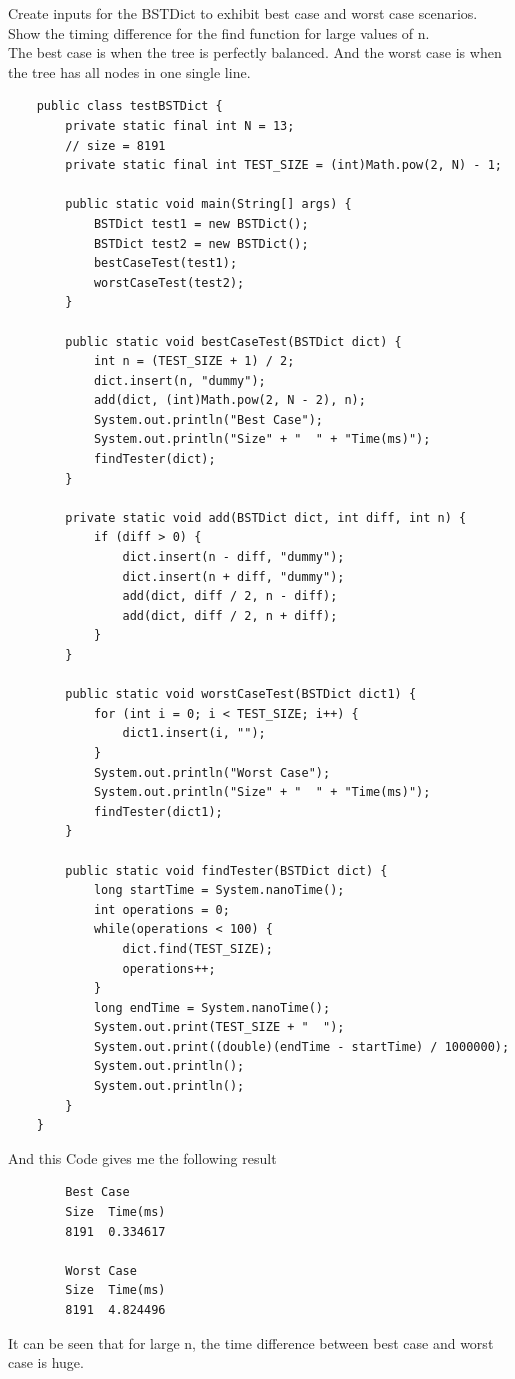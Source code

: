\documentclass[]{exam}
\begin{document}
\begin{questions}
	\question Create inputs for the BSTDict to exhibit best case and worst case scenarios. Show the timing difference for the find function for large values of n.
	\\ The best case is when the tree is perfectly balanced. And the worst case is when the tree has all nodes in one single line.
	\begin{Verbatim}
	public class testBSTDict {
		private static final int N = 13;
		// size = 8191
		private static final int TEST_SIZE = (int)Math.pow(2, N) - 1;

		public static void main(String[] args) {
			BSTDict test1 = new BSTDict();
			BSTDict test2 = new BSTDict();
			bestCaseTest(test1);
			worstCaseTest(test2);
		}
		
		public static void bestCaseTest(BSTDict dict) {
			int n = (TEST_SIZE + 1) / 2;
			dict.insert(n, "dummy");
			add(dict, (int)Math.pow(2, N - 2), n);
			System.out.println("Best Case");
			System.out.println("Size" + "  " + "Time(ms)");
			findTester(dict);
		}
		
		private static void add(BSTDict dict, int diff, int n) {
			if (diff > 0) {
				dict.insert(n - diff, "dummy");
				dict.insert(n + diff, "dummy");
				add(dict, diff / 2, n - diff);
				add(dict, diff / 2, n + diff);
			}
		}
		
		public static void worstCaseTest(BSTDict dict1) {
			for (int i = 0; i < TEST_SIZE; i++) {
				dict1.insert(i, "");
			}
			System.out.println("Worst Case");
			System.out.println("Size" + "  " + "Time(ms)");
			findTester(dict1);
		}
		
		public static void findTester(BSTDict dict) {
			long startTime = System.nanoTime();
			int operations = 0;
			while(operations < 100) {
				dict.find(TEST_SIZE);
				operations++;
			}
			long endTime = System.nanoTime();
			System.out.print(TEST_SIZE + "  ");
			System.out.print((double)(endTime - startTime) / 1000000);
			System.out.println();
			System.out.println();
		}
	}
	\end{Verbatim}
	And this Code gives me the following result\\
	\begin{Verbatim}
		Best Case
		Size  Time(ms)
		8191  0.334617

		Worst Case
		Size  Time(ms)
		8191  4.824496

	\end{Verbatim}
	It can be seen that for large n, the time difference between best case and worst case is huge.


\end{questions}
\end{document}
